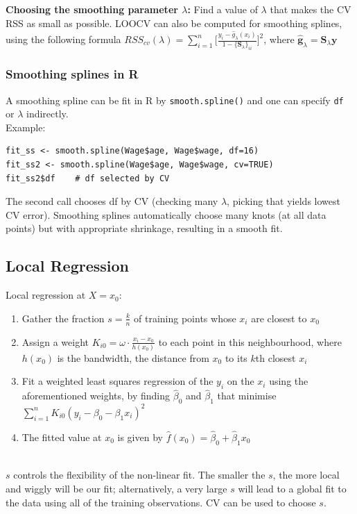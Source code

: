 \documentclass[11pt]{article}
\begin{document}
\noindent \textbf{Choosing the smoothing parameter $\lambda$:} Find a value of $\lambda$ that makes the CV RSS as small as possible. LOOCV can also be computed for smoothing splines, using the following formula $RSS_{cv}(\lambda) = \sum_{i=1}^{n}{\Big[ \frac{y_i - \hat{g}_{\lambda}(x_i)}{1 - \{ \boldsymbol{S}_\lambda \}_{ii}} \Big]^2}$, where $\hat{\boldsymbol{g}}_\lambda = \boldsymbol{S}_{\lambda} \boldsymbol{y}$

\subsubsection{Smoothing splines in R}
\noindent A smoothing spline can be fit in R by \texttt{smooth.spline()} and one can specify \texttt{df} or $\lambda$ indirectly. \\

\noindent Example:
\begin{verbatim}
fit_ss <- smooth.spline(Wage$age, Wage$wage, df=16)
fit_ss2 <- smooth.spline(Wage$age, Wage$wage, cv=TRUE)
fit_ss2$df    # df selected by CV
\end{verbatim}
\noindent The second call chooses df by CV (checking many $\lambda$, picking that yields lowest CV error). Smoothing splines automatically choose many knots (at all data points) but with appropriate shrinkage, resulting in a smooth fit.

\subsection{Local Regression}
\noindent Local regression at $X = x_0$:
\begin{enumerate}
    \item Gather the fraction $s=\frac{k}{n}$ of training points whose $x_i$ are closest to $x_0$
    \item Assign a weight $K_{i0} = \omega \cdot \frac{x_i - x_0}{h(x_0)}$ to each point in this neighbourhood, where $h(x_0)$ is the bandwidth, the distance from $x_0$ to its $k$th closest $x_i$
    \item Fit a weighted least squares regression of the $y_i$ on the $x_i$ using the aforementioned weights, by finding $\hat\beta_0$ and $\hat\beta_1$ that minimise $\sum_{i=1}^{n}{K_{i0}(y_i - \beta_0 - \beta_1x_i)^2}$
    \item The fitted value at $x_0$ is given by $\hat{f}(x_0) = \hat\beta_0 + \hat\beta_1 x_0$
\end{enumerate} \phantom{i} \\
\noindent $s$ controls the flexibility of the non-linear fit. The smaller the $s$, the more local and wiggly will be our fit; alternatively, a very large $s$ will lead to a global fit to the data using all of the training observations. CV can be used to choose $s$. \\
\end{document}
